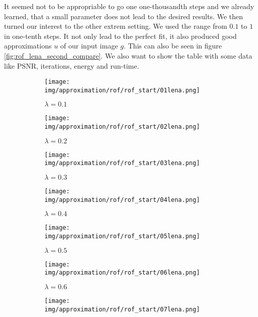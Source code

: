         It seemed not to be appropriable to go one one-thousandth steps and we already learned, that a small parameter does not lead to the desired results. We then turned our interest to the other extrem setting. We used the range from $0.1$ to $1$ in one-tenth steps. It not only lead to the perfect fit, it also produced good approximations $u$ of our input image $g$. This can also be seen in figure \ref{fig:rof_lena_second_compare}. We also want to show the table with some data like PSNR, iterations, energy and run-time.

        \begin{figure}[ht]
            \centering
            \begin{subfigure}[b]{0.18\textwidth}
                \texttt{[image: img/approximation/rof/rof\_start/01lena.png]}
                \caption{$\lambda = 0.1$}
            \end{subfigure}
            \begin{subfigure}[b]{0.18\textwidth}
                \texttt{[image: img/approximation/rof/rof\_start/02lena.png]}
                \caption{$\lambda = 0.2$}
            \end{subfigure}
            \begin{subfigure}[b]{0.18\textwidth}
                \texttt{[image: img/approximation/rof/rof\_start/03lena.png]}
                \caption{$\lambda = 0.3$}
            \end{subfigure}
            \begin{subfigure}[b]{0.18\textwidth}
                \texttt{[image: img/approximation/rof/rof\_start/04lena.png]}
                \caption{$\lambda = 0.4$}
            \end{subfigure}
            \begin{subfigure}[b]{0.18\textwidth}
                \texttt{[image: img/approximation/rof/rof\_start/05lena.png]}
                \caption{$\lambda = 0.5$}
            \end{subfigure}
            \begin{subfigure}[b]{0.18\textwidth}
                \texttt{[image: img/approximation/rof/rof\_start/06lena.png]}
                \caption{$\lambda = 0.6$}
            \end{subfigure}
            \begin{subfigure}[b]{0.18\textwidth}
                \texttt{[image: img/approximation/rof/rof\_start/07lena.png]}

\end{subfigure}
\end{figure}
